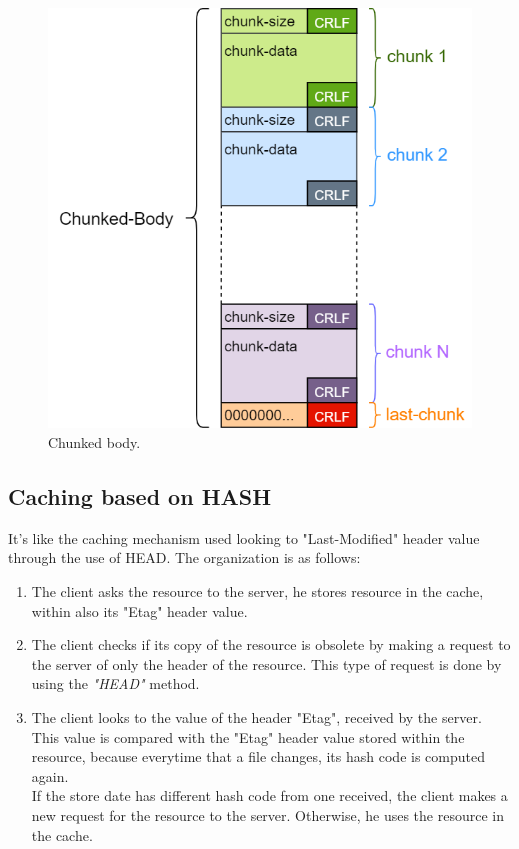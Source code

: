\begin{figure}[h]
\centering
\includegraphics[scale=0.5]{Images/HTTP/Chunked-Body}\caption{\footnotesize{Chunked body.}}\label{chunked_body}
\end{figure}

\subsection{Caching based on HASH}
It's like the caching mechanism used looking to "Last-Modified" header value through the use of HEAD. The organization is as follows:
\begin{enumerate}
\item{The client asks the resource to the server, he stores resource in the cache, within also its "Etag" header value.}
\item{The client checks if its copy of the resource is obsolete by making a request to the server of only the header of the resource. This type of request is done by using the \textit{"HEAD"} method.}
\item{The client looks to the value of the header "Etag", received by the server. This value is compared with the "Etag" header value stored within the resource, because everytime that a file changes, its hash code is computed again.\\
If the store date has different hash code from one received, the client makes a new request for the resource to the server. Otherwise, he uses the resource in the cache.}
\end{enumerate}

